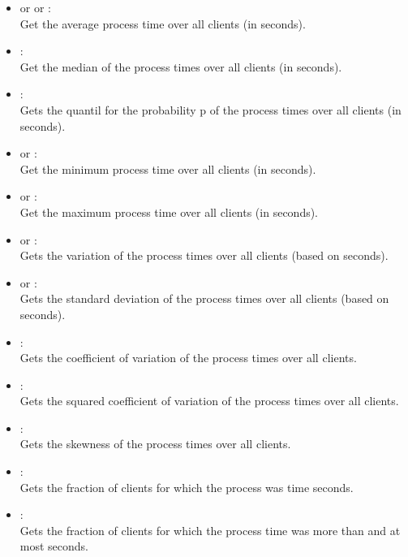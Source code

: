 \begin{itemize}

\item
{} or  or :\\
Get the average process time over all clients (in seconds).

\item
{}:\\
Get the median of the process times over all clients (in seconds).

\item
{}:\\
Gets the quantil for the probability p of the process times over all clients (in seconds).

\item
{} or :\\
Get the minimum process time over all clients (in seconds).

\item
{} or :\\
Get the maximum process time over all clients (in seconds).

\item
{} or :\\
Gets the variation of the process times over all clients (based on seconds).

\item
{} or :\\
Gets the standard deviation of the process times over all clients (based on seconds).

\item
{}:\\
Gets the coefficient of variation of the process times over all clients.

\item
{}:\\
Gets the squared coefficient of variation of the process times over all clients.

\item
{}:\\
Gets the skewness of the process times over all clients.

\item
{}:\\
Gets the fraction of clients for which the process  was time seconds.

\item
{}:\\
Gets the fraction of clients for which the process time was more than  and at most  seconds.

\end{itemize}



